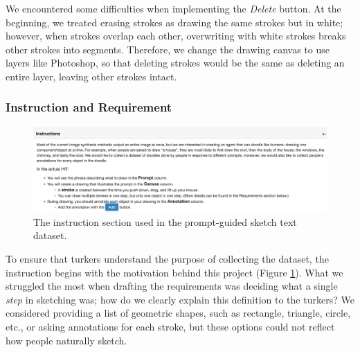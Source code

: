 We encountered some difficulties when implementing the \textit{Delete} button. At the beginning, we treated erasing strokes as drawing the same strokes but in white; however, when strokes overlap each other, overwriting with white strokes breaks other strokes into segments. Therefore, we change the drawing canvas to use layers like Photoshop, so that deleting strokes would be the same as deleting an entire layer, leaving other strokes intact.   

\subsubsection{Instruction and Requirement} \label{v1.interface.requirement.section}

\begin{figure}[!h]    
\includegraphics[width=\linewidth]{data_collection/v1_instruction.png} 
\caption{The instruction section used in the prompt-guided sketch text dataset.}
\label{v1.instruction}
\end{figure}

To ensure that turkers understand the purpose of collecting the dataset, the instruction begins with the motivation behind this project (Figure \ref{v1.instruction}). 
What we struggled the most when drafting the requirements was deciding what a single \textit{step} in sketching was; how do we clearly explain this definition to the turkers? 
We considered providing a list of geometric shapes, such as rectangle, triangle, circle, etc., or asking annotations for each stroke, but these options could not reflect how people naturally sketch.

